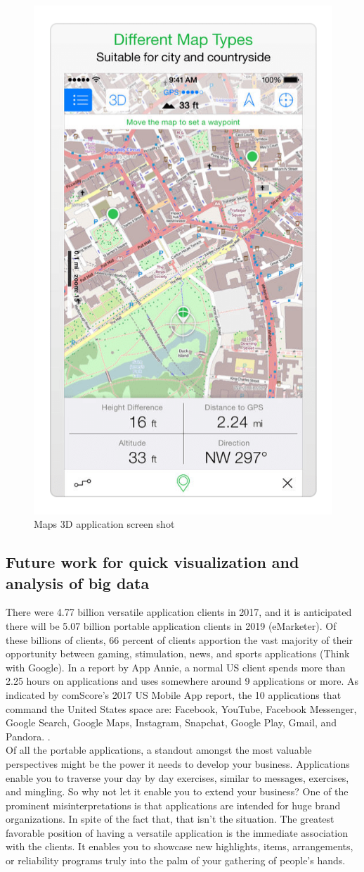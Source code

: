 \begin{itemize}
    \begin{figure}[H]
            \centering
            \includegraphics[width=0.25\linewidth]{figures/ch1/map_3d.png}
            \caption{\label{fig:map_3d} Maps 3D application screen shot \cite{Spatial_Agent}}
    \end{figure}
\end{itemize}

  
\subsection{Future work for quick visualization and analysis of big data}

There were 4.77 billion versatile application clients in 2017, and it is anticipated there will be 5.07 billion portable application clients in 2019 (eMarketer). Of these billions of clients, 66 percent of clients apportion the vast majority of their opportunity between gaming, stimulation, news, and sports applications (Think with Google). In a report by App Annie\cite{AppAnnie}, a normal US client spends more than 2.25 hours on applications and uses somewhere around 9 applications or more. As indicated by comScore's 2017 US Mobile App report, the 10 applications that command the United States space are: Facebook, YouTube, Facebook Messenger, Google Search, Google Maps, Instagram, Snapchat, Google Play, Gmail, and Pandora. \cite{eBiz_solutions}. \\
Of all the portable applications, a standout amongst the most valuable perspectives might be the power it needs to develop your business. Applications enable you to traverse your day by day exercises, similar to messages, exercises, and mingling. So why not let it enable you to extend your business? One of the prominent misinterpretations is that applications are intended for huge brand organizations. In spite of the fact that, that isn't the situation. The greatest favorable position of having a versatile application is the immediate association with the clients. It enables you to showcase new highlights, items, arrangements, or reliability programs truly into the palm of your gathering of people's hands.

